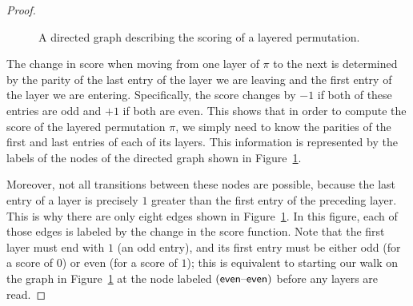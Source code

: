 \begin{proof}
\begin{figure}[ht]
\begin{footnotesize}
		\end{footnotesize}
		\caption{A directed graph describing the scoring of a layered permutation.}
		\label{fig-layered-zeta-automaton}
	\end{figure}

	The change in score when moving from one layer of $\pi$ to the next is determined by the parity of the last entry of the layer we are leaving and the first entry of the layer we are entering. Specifically, the score changes by $-1$ if both of these entries are odd and $+1$ if both are even. This shows that in order to compute the score of the layered permutation $\pi$, we simply need to know the parities of the first and last entries of each of its layers. This information is represented by the labels of the nodes of the directed graph shown in Figure~\ref{fig-layered-zeta-automaton}.

	Moreover, not all transitions between these nodes are possible, because the last entry of a layer is precisely $1$ greater than the first entry of the preceding layer. This is why there are only eight edges shown in Figure~\ref{fig-layered-zeta-automaton}. In this figure, each of those edges is labeled by the change in the score function. Note that the first layer must end with $1$ (an odd entry), and its first entry must be either odd (for a score of $0$) or even (for a score of $1$); this is equivalent to starting our walk on the graph in Figure~\ref{fig-layered-zeta-automaton} at the node labeled $(\textsf{even}\text{--}\textsf{even})$ before any layers are read.


\end{proof}
